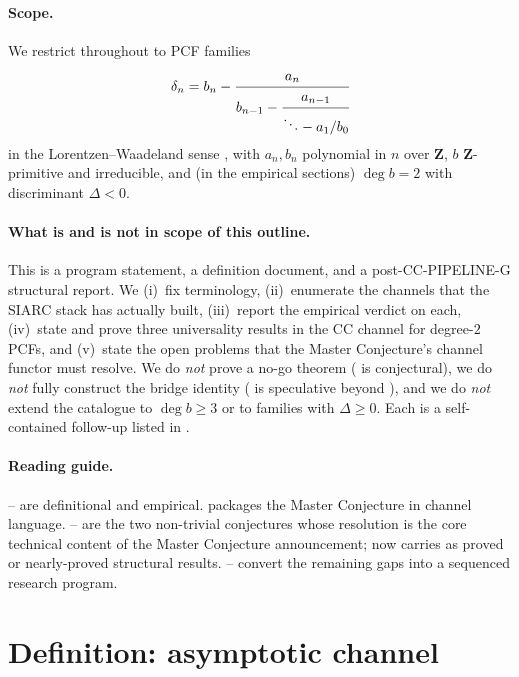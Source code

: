 \documentclass[11pt,reqno]{amsart}
\theoremstyle{plain}
\theoremstyle{definition}
\theoremstyle{remark}
\newcommand{\CC}{\mathrm{CC}}
\newcommand{\dn}{\delta_{n}}
\begin{document}
\paragraph{Scope.}
We restrict throughout to PCF families
\[
  \dn = b_n - \cfrac{a_n}{b_{n-1} - \cfrac{a_{n-1}}{\ddots - a_1/b_0}}
\]
in the Lorentzen--Waadeland sense \cite{lorentzen2008continued},
with $a_n, b_n$ polynomial in $n$ over $\mathbf{Z}$, $b$
$\mathbf{Z}$-primitive and irreducible, and (in the empirical
sections) $\deg b = 2$ with discriminant $\Delta < 0$.

\paragraph{What is and is not in scope of this outline.}
This is a program statement, a definition document, and a
post-CC-PIPELINE-G structural report. We
(i)~fix terminology, (ii)~enumerate the channels that the
SIARC stack has actually built, (iii)~report the empirical
verdict on each, (iv)~state and prove three universality
results in the $\CC$ channel for degree-$2$ PCFs, and
(v)~state the open problems that the Master Conjecture's
channel functor must resolve. We do \emph{not} prove a no-go
theorem ( is conjectural), we do \emph{not}
fully construct the bridge identity
( is speculative beyond
), and we do \emph{not} extend the catalogue to
$\deg b \ge 3$ or to families with $\Delta \geq 0$. Each is a
self-contained follow-up listed in .

\paragraph{Reading guide.}
-- are definitional and
empirical.  packages the Master
Conjecture in channel language. --%
 are the two non-trivial conjectures whose
resolution is the core technical content of the Master
Conjecture announcement;  now carries
 as proved or
nearly-proved structural results.
-- convert the
remaining gaps into a sequenced research program.

\section{Definition: asymptotic channel}
\label{sec:def}
\end{document}
